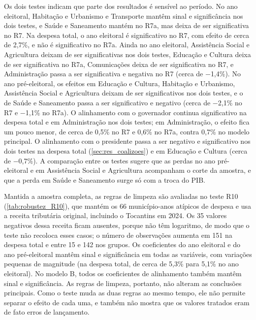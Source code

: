 Os dois testes indicam que parte dos resultados é sensível ao período. No ano eleitoral, Habitação e Urbanismo e Transporte mantêm sinal e significância nos dois testes, e Saúde e Saneamento mantém no R7a, mas deixa de ser significativa no R7. Na despesa total, o ano eleitoral é significativo no R7, com efeito de cerca de 2,7\%, e não é significativo no R7a. Ainda no ano eleitoral, Assistência Social e Agricultura deixam de ser significativas nos dois testes, Educação e Cultura deixa de ser significativa no R7a, Comunicações deixa de ser significativa no R7, e Administração passa a ser significativa e negativa no R7 (cerca de $-$1,4\%). No ano pré-eleitoral, os efeitos em Educação e Cultura, Habitação e Urbanismo, Assistência Social e Agricultura deixam de ser significativos nos dois testes, e o de Saúde e Saneamento passa a ser significativo e negativo (cerca de $-$2,1\% no R7 e $-$1,1\% no R7a). O alinhamento com o governador continua significativo na despesa total e em Administração nos dois testes; em Administração, o efeito fica um pouco menor, de cerca de 0,5\% no R7 e 0,6\% no R7a, contra 0,7\% no modelo principal. O alinhamento com o presidente passa a ser negativo e significativo nos dois testes na despesa total (\autoref{sec:res_coalizoes}) e em Educação e Cultura (cerca de $-$0,7\%). A comparação entre os testes sugere que as perdas no ano pré-eleitoral e em Assistência Social e Agricultura acompanham o corte da amostra, e que a perda em Saúde e Saneamento surge só com a troca do PIB.

Mantida a amostra completa, as regras de limpeza são avaliadas no teste R10 (\autoref{tab:robustez_R10}), que mantém os 66 município-anos atípicos de despesa e usa a receita tributária original, incluindo o Tocantins em 2024. Os 35 valores negativos dessa receita ficam ausentes, porque não têm logaritmo, de modo que o teste não recoloca esses casos; o número de observações aumenta em 151 na despesa total e entre 15 e 142 nos grupos. Os coeficientes do ano eleitoral e do ano pré-eleitoral mantêm sinal e significância em todas as variáveis, com variações pequenas de magnitude (na despesa total, de cerca de 5,3\% para 5,1\% no ano eleitoral). No modelo B, todos os coeficientes de alinhamento também mantêm sinal e significância. As regras de limpeza, portanto, não alteram as conclusões principais. Como o teste muda as duas regras ao mesmo tempo, ele não permite separar o efeito de cada uma, e também não mostra que os valores tratados eram de fato erros de lançamento.

